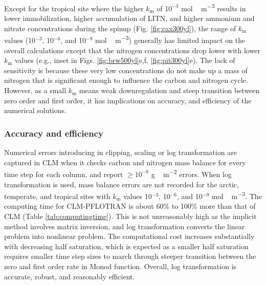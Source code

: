 \documentclass[gmd, manuscript]{copernicus}
\begin{document}
Except for the tropical site where the higher $k_\text{m}$ of 1$0^{-3}$
\unit{mol\,m^{-3}} results in lower immobilization, higher accumulation of
LITN, and  higher ammonium and nitrate concentrations during the spinup (Fig.
\ref{fig:cax300yl}), the range of $k_\text{m}$ values (10$^{-3}$, 10$^{-6}$,
and 10$^{-9}$ \unit{mol\,m^{-3}}) generally has limited impact on the overall
calculations except that the nitrogen concentrations drop lower with lower
$k_\text{m}$ values (e.g., inset in Figs. \ref{fig:brw500yl}e,f,
\ref{fig:pit300yl}e). The lack of
sensitivity is because these very low concentrations do not make up a mass of
nitrogen that is significant enough to influence the carbon and nitrogen cycle.
However, as a small $k_\text{m}$ means weak downregulation and steep transition
between zero order and first order, it has implications on accuracy,
and efficiency of the numerical solutions.

\subsubsection{Accuracy and efficiency}
Numerical errors introducing in clipping, scaling or log transformation are captured in CLM when it checks carbon and nitrogen mass
balance for every time step for each column, and report  $\geq 10^{-8}$ \unit{g\,m^{-2}} errors.  When log transformation is used, 
mass balance errors are not recorded for the arctic, temperate, and tropical sites with $k_\text{m}$ values 
10$^{-3}$, 10$^{-6}$, and 10$^{-9}$ \unit{mol\,m^{-3}}. The computing time for
CLM-PFLOTRAN is about 60\% to 100\% more than that of CLM (Table
\ref{tab:computingtime}). This is not unreasonably high as the implicit
method involves matrix inversion, and log transformation converts the linear
problem into nonlinear problem. The computational cost increases substantially with
decreasing half saturation, which is expected as a smaller half saturation
requires smaller time step sizes to march through steeper transition between
the zero and first order rate in Monod function. Overall, log transformation is
accurate, robust, and reasonably efficient.  
\end{document}
